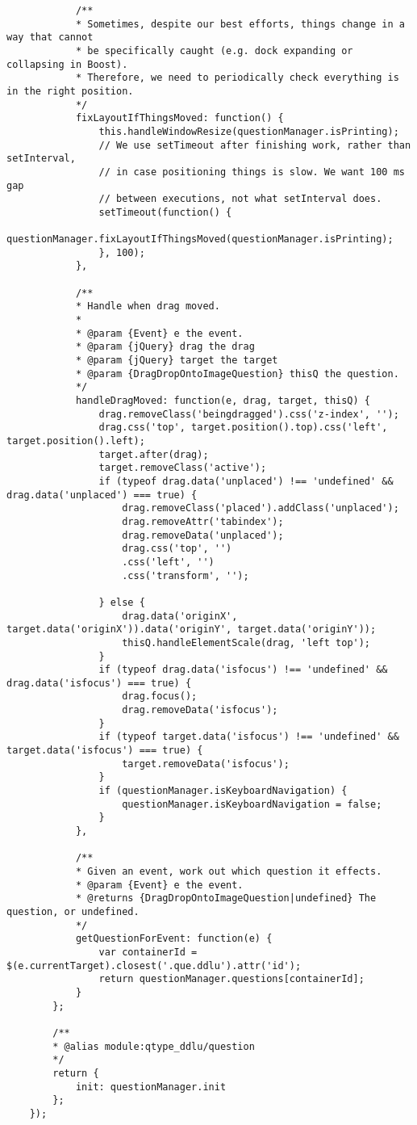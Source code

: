 \begin{lstlisting}
			/**
			* Sometimes, despite our best efforts, things change in a way that cannot
			* be specifically caught (e.g. dock expanding or collapsing in Boost).
			* Therefore, we need to periodically check everything is in the right position.
			*/
			fixLayoutIfThingsMoved: function() {
				this.handleWindowResize(questionManager.isPrinting);
				// We use setTimeout after finishing work, rather than setInterval,
				// in case positioning things is slow. We want 100 ms gap
				// between executions, not what setInterval does.
				setTimeout(function() {
					questionManager.fixLayoutIfThingsMoved(questionManager.isPrinting);
				}, 100);
			},
			
			/**
			* Handle when drag moved.
			*
			* @param {Event} e the event.
			* @param {jQuery} drag the drag
			* @param {jQuery} target the target
			* @param {DragDropOntoImageQuestion} thisQ the question.
			*/
			handleDragMoved: function(e, drag, target, thisQ) {
				drag.removeClass('beingdragged').css('z-index', '');
				drag.css('top', target.position().top).css('left', target.position().left);
				target.after(drag);
				target.removeClass('active');
				if (typeof drag.data('unplaced') !== 'undefined' && drag.data('unplaced') === true) {
					drag.removeClass('placed').addClass('unplaced');
					drag.removeAttr('tabindex');
					drag.removeData('unplaced');
					drag.css('top', '')
					.css('left', '')
					.css('transform', '');
					
				} else {
					drag.data('originX', target.data('originX')).data('originY', target.data('originY'));
					thisQ.handleElementScale(drag, 'left top');
				}
				if (typeof drag.data('isfocus') !== 'undefined' && drag.data('isfocus') === true) {
					drag.focus();
					drag.removeData('isfocus');
				}
				if (typeof target.data('isfocus') !== 'undefined' && target.data('isfocus') === true) {
					target.removeData('isfocus');
				}
				if (questionManager.isKeyboardNavigation) {
					questionManager.isKeyboardNavigation = false;
				}
			},
			
			/**
			* Given an event, work out which question it effects.
			* @param {Event} e the event.
			* @returns {DragDropOntoImageQuestion|undefined} The question, or undefined.
			*/
			getQuestionForEvent: function(e) {
				var containerId = $(e.currentTarget).closest('.que.ddlu').attr('id');
				return questionManager.questions[containerId];
			}
		};
		
		/**
		* @alias module:qtype_ddlu/question
		*/
		return {
			init: questionManager.init
		};
	});
\end{lstlisting}


